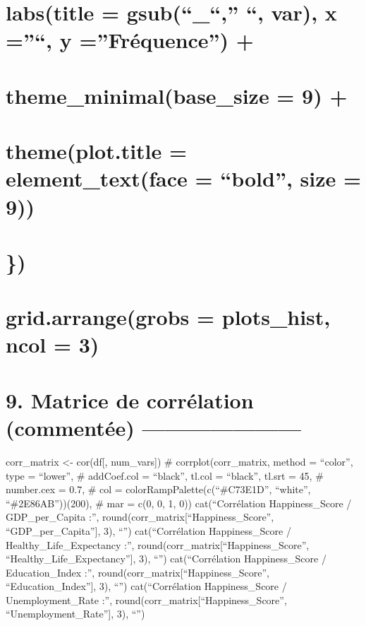 \documentclass[
]{article}
\begin{document}
\section{\texorpdfstring{labs(title = gsub(``\_``,'' ``, var), x =''``,
y =''Fréquence'')
+}{labs(title = gsub(``\_``,'' ``, var), x =''\,``, y =''Fréquence'') +}}\label{labstitle-gsub_-var-x-y-fruxe9quence}

\section{theme\_minimal(base\_size = 9)
+}\label{theme_minimalbase_size-9}

\section{theme(plot.title = element\_text(face = ``bold'', size =
9))}\label{themeplot.title-element_textface-bold-size-9}

\section{\})}\label{section-2}

\section{grid.arrange(grobs = plots\_hist, ncol =
3)}\label{grid.arrangegrobs-plots_hist-ncol-3}

\section{9. Matrice de corrélation (commentée)
---------------------}\label{matrice-de-corruxe9lation-commentuxe9e}

corr\_matrix \textless- cor(df{[}, num\_vars{]}) \#
corrplot(corr\_matrix, method = ``color'', type = ``lower'', \#
addCoef.col = ``black'', tl.col = ``black'', tl.srt = 45, \# number.cex
= 0.7, \# col = colorRampPalette(c(``\#C73E1D'', ``white'',
``\#2E86AB''))(200), \# mar = c(0, 0, 1, 0)) cat(``Corrélation
Happiness\_Score / GDP\_per\_Capita :'',
round(corr\_matrix{[}``Happiness\_Score'', ``GDP\_per\_Capita''{]}, 3),
``\n'') cat(``Corrélation Happiness\_Score / Healthy\_Life\_Expectancy
:'', round(corr\_matrix{[}``Happiness\_Score'',
``Healthy\_Life\_Expectancy''{]}, 3), ``\n'') cat(``Corrélation
Happiness\_Score / Education\_Index :'',
round(corr\_matrix{[}``Happiness\_Score'', ``Education\_Index''{]}, 3),
``\n'') cat(``Corrélation Happiness\_Score / Unemployment\_Rate :'',
round(corr\_matrix{[}``Happiness\_Score'', ``Unemployment\_Rate''{]},
3), ``\n\n'')
\end{document}
